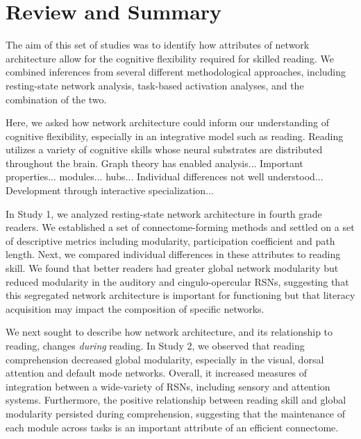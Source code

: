 \chapter{Review and Summary}

The aim of this set of studies was to identify how attributes of network architecture allow for the cognitive flexibility required for skilled reading. We combined inferences from several different methodological approaches, including resting-state network analysis, task-based activation analyses, and the combination of the two.  

Here, we asked how network architecture could inform our understanding of cognitive flexibility, especially in an integrative model such as reading. Reading utilizes a variety of cognitive skills whose neural substrates are distributed throughout the brain. Graph theory has enabled analysis...
Important properties... modules... hubs...
Individual differences not well understood...
Development through interactive specialization...

In Study 1, we analyzed resting-state network architecture in  fourth grade readers. We established a set of connectome-forming methods and settled on a set of descriptive metrics including modularity, participation coefficient and path length. Next, we compared individual differences in these attributes to reading skill. We found that better readers had greater global network modularity but reduced modularity in the auditory and cingulo-opercular RSNs, suggesting that this segregated network architecture is important for functioning but that literacy acquisition may impact the composition of specific networks. 

We next sought to describe how network architecture, and its relationship to reading, changes \textit{during} reading. In Study 2, we observed that reading comprehension decreased global modularity, especially in the visual, dorsal attention and default mode networks. Overall, it increased measures of integration between a wide-variety of RSNs, including sensory and attention systems. Furthermore, the positive relationship between reading skill and global modularity persisted during comprehension, suggesting that the maintenance of each module across tasks is an important attribute of an efficient connectome. 


